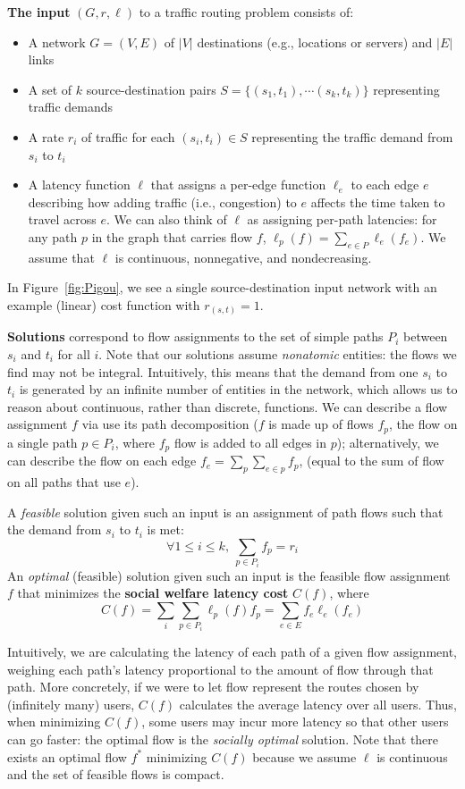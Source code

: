 \medskip\noindent
\textbf{The input} $(G,r,\ell)$ to a traffic routing problem consists of:
\begin{itemize}
    \item A network $G = (V, E)$ of $|V|$ destinations (e.g., locations or servers) and $|E|$ links 
     \item A set of $k$ source-destination pairs $S=\{(s_1,t_1), \cdots (s_k,t_k)\}$ representing traffic demands
    \item A {rate} $r_i$ of traffic for each $(s_i,t_i)\in S$ representing the traffic demand from $s_i$ to $t_i$
    \item A {latency} function $\ell$ that assigns a per-edge function $\ell_e$ to each edge $e$ describing how adding traffic (i.e., congestion) to $e$ affects the time taken to travel across $e$. We can also think of $\ell$ as assigning per-path latencies: for any path $p$ in the graph that carries flow $f$,
        $\ell_p(f) = \sum_{e\in P}\ell_e(f_e)$.
        We assume that $\ell$ is continuous, nonnegative, and nondecreasing.
\end{itemize}
In Figure~\ref{fig:Pigou}, we see a single source-destination input network with an example (linear) cost function with $r_{(s,t)} = 1$.

\medskip\noindent
\textbf{Solutions} correspond to flow assignments to the set of simple paths $P_i$ between $s_i$ and $t_i$ for all $i$. Note that our solutions assume \emph{nonatomic} entities: the flows we find may not be integral.
Intuitively, this means that the demand from one $s_i$ to $t_i$ is generated by an infinite number
of entities in the network, which allows us to reason about continuous, rather than discrete, functions.
%
We can describe a flow assignment $f$ via use its path decomposition ($f$ is made up of flows $f_p$, the flow on a single path $p \in P_i$, where $f_p$ flow is added to all edges in $p$); alternatively, we can describe the flow on each edge $f_e = \sum_p \sum_{e\in p} f_p$, (equal to the sum of flow on all paths that use $e$).

A \emph{feasible} solution given such an input is an assignment of path flows such that the demand from $s_i$ to $t_i$ is met:
$$\forall 1 \le i \le k,~\sum_{p\in P_i} f_p = r_i$$
%
An \emph{optimal} (feasible) solution given such an input is the feasible flow assignment $f$ that minimizes the \textbf{social welfare latency cost} $C(f)$, where
$$C(f) = \sum_i\sum_{p\in P_i}\ell_p(f)f_p = \sum_{e\in E} f_e\ell_e(f_e)$$

Intuitively, we are calculating the latency of each path of a given flow assignment, weighing 
each path's latency proportional to the amount of flow through that path. More concretely,
if we were to let flow represent the routes chosen by (infinitely many) users, $C(f)$ calculates the average latency over all users. Thus, when minimizing $C(f)$, some users may incur 
more latency so that other users can go faster: the optimal flow is the \emph{socially optimal} solution.
Note that there exists an optimal flow $f^*$ minimizing $C(f)$ because we assume $\ell$ is continuous and the set of feasible flows is compact.

